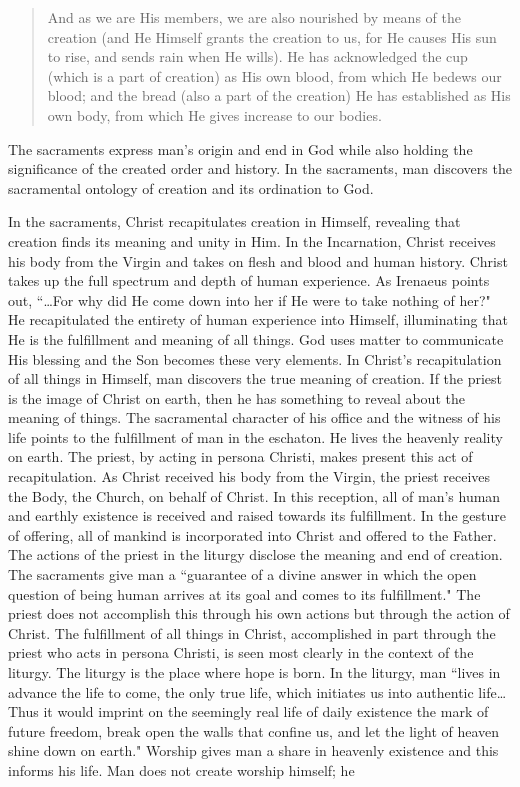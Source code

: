 \documentclass[twoside,10pt]{article}
\begin{document}
\begin{quote}
	And as we are His members, we are also nourished by means of the creation (and He Himself grants the creation to us, for He causes His sun to rise, and sends rain when He wills). He has acknowledged the cup (which is a part of creation) as His own blood, from which He bedews our blood; and the bread (also a part of the creation) He has established as His own body, from which He gives increase to our bodies.\autocite[\nopp V. 2. 2]{irenaeus}
\end{quote}

The sacraments express man’s origin and end in God while also holding the significance of the created order and history. In the sacraments, man discovers the sacramental ontology of creation and its ordination to God. 

In the sacraments, Christ recapitulates creation in Himself, revealing that creation finds its meaning and unity in Him. In the Incarnation, Christ receives his body from the Virgin and takes on flesh and blood and human history. Christ takes up the full spectrum and depth of human experience. As Irenaeus points out, ``…For why did He come down into her if He were to take nothing of her?"\autocite[\nopp III. 22. 2]{irenaeus} He recapitulated the entirety of human experience into Himself, illuminating that He is the fulfillment and meaning of all things. God uses matter to communicate His blessing and the Son becomes these very elements.\autocite[\nopp III. 11. 5]{irenaeus} In Christ’s recapitulation of all things in Himself, man discovers the true meaning of creation. If the priest is the image of Christ on earth, then he has something to reveal about the meaning of things. The sacramental character of his office and the witness of his life points to the fulfillment of man in the eschaton. He lives the heavenly reality on earth. The priest, by acting in persona Christi, makes present this act of recapitulation. As Christ received his body from the Virgin, the priest receives the Body, the Church, on behalf of Christ. In this reception, all of man’s human and earthly existence is received and raised towards its fulfillment. In the gesture of offering, all of mankind is incorporated into Christ and offered to the Father. The actions of the priest in the liturgy disclose the meaning and end of creation. The sacraments give man a ``guarantee of a divine answer in which the open question of being human arrives at its goal and comes to its fulfillment."\autocite[168]{rat2} The priest does not accomplish this through his own actions but through the action of Christ. The fulfillment of all things in Christ, accomplished in part through the priest who acts in persona Christi, is seen most clearly in the context of the liturgy. The liturgy is the place where hope is born. In the liturgy, man ``lives in advance the life to come, the only true life, which initiates us into authentic life…Thus it would imprint on the seemingly real life of daily existence the mark of future freedom, break open the walls that confine us, and let the light of heaven shine down on earth."\autocite[14]{rat4} Worship gives man a share in heavenly existence and this informs his life. Man does not create worship himself; he 
\end{document}
